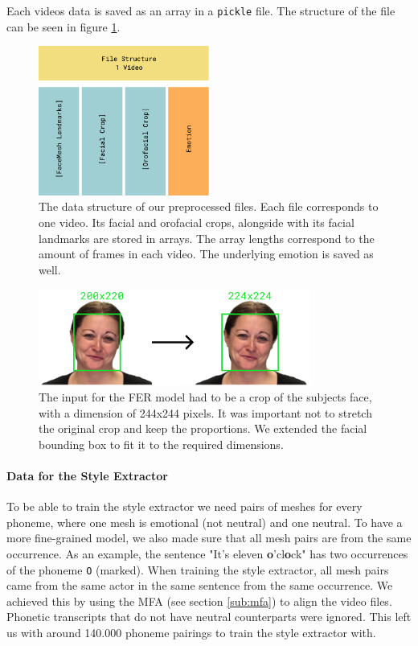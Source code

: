 Each videos data is saved as an array in a \texttt{pickle} file. The structure of the file can be seen in figure \ref{fig:pickle}.
\begin{figure}
    \centering
    \includegraphics[width=0.5\textwidth]{res/Pickle.pdf}
    \caption{The data structure of our preprocessed files. Each file corresponds to one video. Its facial and orofacial crops, alongside with its facial landmarks are stored in arrays. The array lengths correspond to the amount of frames in each video. The underlying emotion is saved as well.}
    \label{fig:pickle}
\end{figure}

\begin{figure}
    \centering
    \includegraphics[width=0.8\textwidth]{res/croppng.png}
    \caption{The input for the FER model had to be a crop of the subjects face, with a dimension of 244x244 pixels. It was important not to stretch the original crop and keep the proportions. We extended the facial bounding box to fit it to the required dimensions.}
    \label{fig:crop}
\end{figure}


\paragraph{Data for the Style Extractor}
To be able to train the style extractor we need pairs of meshes for every phoneme, where one mesh is emotional (not neutral) and one neutral. To have a more fine-grained model, we also made sure that all mesh pairs are from the same occurrence. As an example, the sentence "It's eleven \textbf{o}'cl\textbf{o}ck" has two occurrences of the phoneme \texttt{O} (marked). When training the style extractor, all mesh pairs came from the same actor in the same sentence from the same occurrence. We achieved this by using the MFA (see section \ref{sub:mfa}) to align the video files. Phonetic transcripts that do not have neutral counterparts were ignored. This left us with around 140.000 phoneme pairings to train the style extractor with. 


